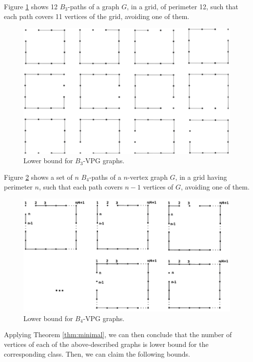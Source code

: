 Figure \ref{VPG:lower-B3} shows 12 $B_3$-paths of a graph $G$, in a grid, of perimeter 12, such that each path covers 11  vertices of the grid,  avoiding one of them. 

\begin{figure}[!h]
    \centering
    \includegraphics[width=12cm]{./img/lower-bound-B3-VPG.pdf}
    \caption{Lower bound for $B_3$-VPG graphs.}
    \label{VPG:lower-B3}
\end{figure}

Figure \ref{VPG:lower-B4} shows a set of $n$ $B_4$-paths of a $n$-vertex graph $G$, in a grid having perimeter $n$,  such that each path covers $n-1$  vertices of $G$, avoiding one of them. 

\begin{figure}[!h]
    \centering
    \includegraphics[width=12cm]{./img/lower-bound-B4-VPG.pdf}
    \caption{Lower bound for $B_4$-VPG graphs.}
    \label{VPG:lower-B4}
\end{figure}

Applying Theorem \ref{thm:minimal}, we can then conclude that the number of vertices of each of the above-described graphs is lower bound for the corresponding class. Then, we can claim the following bounds.

